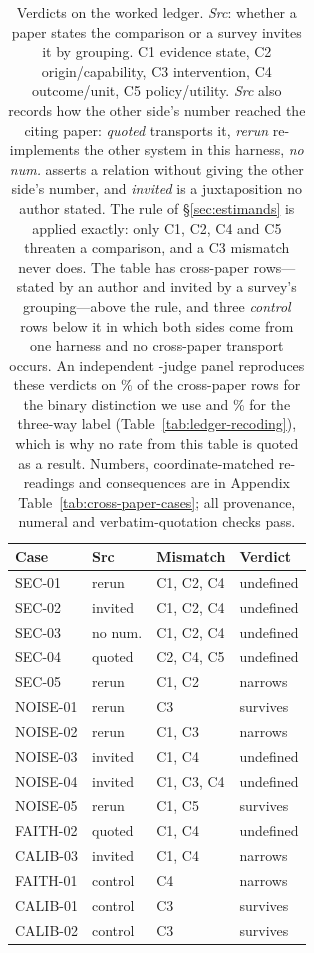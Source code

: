 \begin{table}[t]
\centering\footnotesize
\setlength{\tabcolsep}{3pt}
\begin{tabular}{@{}llll@{}}
\toprule
Case & Src & Mismatch & Verdict \\
\midrule
SEC-01 & rerun & C1, C2, C4 & undefined \\
SEC-02 & invited & C1, C2, C4 & undefined \\
SEC-03 & no num. & C1, C2, C4 & undefined \\
SEC-04 & quoted & C2, C4, C5 & undefined \\
SEC-05 & rerun & C1, C2 & narrows \\
NOISE-01 & rerun & C3 & survives \\
NOISE-02 & rerun & C1, C3 & narrows \\
NOISE-03 & invited & C1, C4 & undefined \\
NOISE-04 & invited & C1, C3, C4 & undefined \\
NOISE-05 & rerun & C1, C5 & survives \\
FAITH-02 & quoted & C1, C4 & undefined \\
CALIB-03 & invited & C1, C4 & narrows \\
\midrule
FAITH-01 & control & C4 & narrows \\
CALIB-01 & control & C3 & survives \\
CALIB-02 & control & C3 & survives \\
\bottomrule
\end{tabular}
\caption{Verdicts on the worked ledger. \emph{Src}: whether a paper states the comparison or a survey invites it by grouping. C1 evidence state, C2 origin/capability, C3 intervention, C4 outcome/unit, C5 policy/utility. \emph{Src} also records how the other side's number reached the citing paper: \emph{quoted} transports it, \emph{rerun} re-implements the other system in this harness, \emph{no num.} asserts a relation without giving the other side's number, and \emph{invited} is a juxtaposition no author stated. The rule of \S\ref{sec:estimands} is applied exactly: only C1, C2, C4 and C5 threaten a comparison, and a C3 mismatch never does. The table has \LedgerCrossPaper{} cross-paper rows---\LedgerStated{} stated by an author and \LedgerInvited{} invited by a survey's grouping---above the rule, and three \emph{control} rows below it in which both sides come from one harness and no cross-paper transport occurs. An independent \RecJudges{}-judge panel reproduces these verdicts on \RecBinaryPct\% of the cross-paper rows for the binary distinction we use and \RecThreeWayPct\% for the three-way label (Table~\ref{tab:ledger-recoding}), which is why no rate from this table is quoted as a result. Numbers, coordinate-matched re-readings and consequences are in Appendix Table~\ref{tab:cross-paper-cases}; all \VerifChecks{} provenance, numeral and verbatim-quotation checks pass.}
\label{tab:cross-paper-cases-compact}
\end{table}
